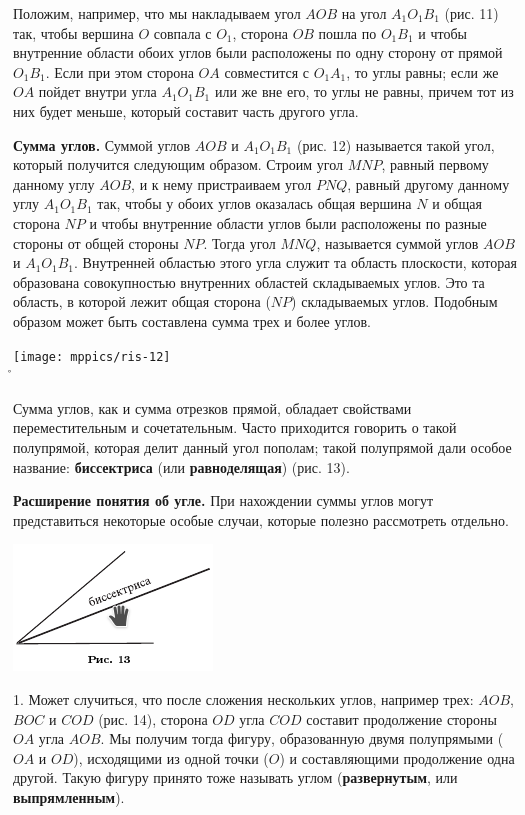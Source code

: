 \documentclass[oneside]{book}
\begin{document}
Положим, например, что мы накладываем угол $AOB$ на угол $A_1O_1B_1$ (рис. 11) так, чтобы вершина $O$ совпала с $O_1$, сторона $OB$ пошла по $O_1B_1$ и чтобы внутренние области обоих углов были расположены по одну сторону от прямой $O_1B_1$.
Если при этом сторона $OA$ совместится с $O_1A_1$, то углы равны;
если же $OA$ пойдет внутри угла $A_1O_1B_1$ или же вне его, то углы не равны, причем тот из них будет меньше, который составит часть другого угла.

\textbf{Сумма углов.}
Суммой углов $AOB$ и $A_1O_1B_1$ (рис. 12) называется такой угол, который получится следующим образом.
Строим угол $MNP$, равный первому данному углу $AOB$, и к нему пристраиваем угол $PNQ$, равный другому данному углу $A_1O_1B_1$ так, чтобы у обоих углов оказалась общая вершина $N$ и общая сторона $NP$ и чтобы внутренние области углов были расположены по разные стороны от общей стороны $NP$.
Тогда угол $MNQ$, называется суммой углов $AOB$ и $A_1O_1B_1$.
Внутренней областью этого угла служит та область плоскости, которая образована совокупностью внутренних областей складываемых углов.
Это та область, в которой лежит общая сторона ($NP$) складываемых углов.
Подобным образом может быть составлена сумма трех и более углов.

\begin{center}
	\texttt{[image: mppics/ris-12]}\\
	\r
\end{center}

Сумма углов, как и сумма отрезков прямой, обладает свойствами переместительным и сочетательным.
Часто приходится говорить о такой полупрямой, которая делит данный угол пополам;
такой полупрямой дали особое название:
\textbf{биссектриса} (или \textbf{равноделящая}) (рис. 13).


\textbf{Расширение понятия об угле.}
При нахождении суммы углов могут представиться некоторые особые случаи, которые полезно рассмотреть отдельно.

\includegraphics{pics/ris-13}

1.
Может случиться, что после сложения нескольких углов, например трех:
$AOB$, $BOC$ и $COD$ (рис. 14), сторона $OD$ угла $COD$ составит продолжение стороны $OA$ угла $AOB$.
Мы получим тогда фигуру, образованную двумя полупрямыми ($OA$ и $OD$), исходящими из одной точки ($O$) и составляющими продолжение одна другой.
Такую фигуру принято тоже называть углом (\textbf{развернутым}, или \textbf{выпрямленным}).
\end{document}
